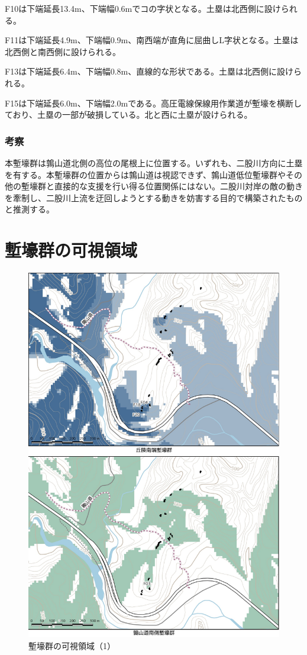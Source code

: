 \documentclass[11pt,report]{jsarticle}
\begin{document}
F10は下端延長13.4m、下端幅0.6mでコの字状となる。土塁は北西側に設けられる。

F11は下端延長4.9m、下端幅0.9m、南西端が直角に屈曲しL字状となる。土塁は北西側と南西側に設けられる。

F13は下端延長6.4m、下端幅0.8m、直線的な形状である。土塁は北西側に設けられる。

F15は下端延長6.0m、下端幅2.0mである。高圧電線保線用作業道が塹壕を横断しており、土塁の一部が破損している。北と西に土塁が設けられる。

\subsubsection*{考察}
本塹壕群は鶉山道北側の高位の尾根上に位置する。いずれも、二股川方向に土塁を有する。本塹壕群の位置からは鶉山道は視認できず、鶉山道低位塹壕群やその他の塹壕群と直接的な支援を行い得る位置関係にはない。二股川対岸の敵の動きを牽制し、二股川上流を迂回しようとする動きを妨害する目的で構築されたものと推測する。


\section{塹壕群の可視領域}

\begin{figure}[ht]
\centering
\includegraphics[width=160truemm]{../02fig/08view01.pdf}
\caption{塹壕群の可視領域（1）}
\label{view01}
\end{figure}
\end{document}
